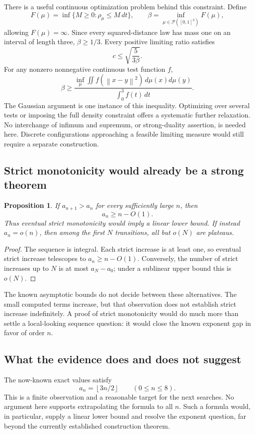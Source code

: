 \documentclass[11pt,letterpaper]{article}
\newtheorem{proposition}[theorem]{Proposition}
\theoremstyle{definition}
\newcommand{\floor}[1]{\left\lfloor #1\right\rfloor}
\newcommand{\norm}[1]{\left\lVert #1\right\rVert}
\begin{document}
There is a useful continuous optimization problem behind this
constraint. Define
\[
 F(\mu)=\inf\{M\ge0:\rho_\mu\le M\,dt\},\qquad
 \beta=\inf_{\mu\in\mathcal P([0,1]^3)}F(\mu),
\]
allowing \(F(\mu)=\infty\). Since every squared-distance law has
mass one on an interval of length three, \(\beta\ge1/3\).
Every positive limiting ratio satisfies
\[
 c\le\sqrt{\frac5{3\beta}}.
\]
For any nonzero nonnegative continuous test function \(f\),
\[
 \beta\ge
 \frac{\displaystyle\inf_\mu
   \iint f(\norm{x-y}^2)\,d\mu(x)d\mu(y)}
      {\displaystyle\int_0^3f(t)\,dt}.
\]
The Gaussian argument is one instance of this inequality. Optimizing
over several tests or imposing the full density constraint offers
a systematic further relaxation. No interchange of infimum and
supremum, or strong-duality assertion, is needed here. Discrete
configurations approaching a feasible limiting measure would still
require a separate construction.

\subsection{Strict monotonicity would already be a strong theorem}
\begin{proposition}
\label{prop:strict}
If \(a_{n+1}>a_n\) for every sufficiently large \(n\), then
\[
 a_n\ge n-O(1).
\]
Thus eventual strict monotonicity would imply a linear lower bound.
If instead \(a_n=o(n)\), then among the first \(N\) transitions,
all but \(o(N)\) are plateaus.
\end{proposition}
\begin{proof}
The sequence is integral. Each strict increase is at least one, so
eventual strict increase telescopes to \(a_n\ge n-O(1)\).
Conversely, the number of strict increases up to \(N\) is at most
\(a_N-a_0\); under a sublinear upper bound this is \(o(N)\).
\end{proof}

The known asymptotic bounds do not decide between these alternatives.
The small computed terms increase, but that observation does not
establish strict increase indefinitely. A proof of strict monotonicity
would do much more than settle a local-looking sequence question: it
would close the known exponent gap in favor of order \(n\).

\subsection{What the evidence does and does not suggest}
The now-known exact values satisfy
\[
 a_n=\floor{3n/2}\qquad(0\le n\le8).
\]
This is a finite observation and a reasonable target for the next
searches. No argument here supports extrapolating the formula to all
\(n\). Such a formula would, in particular, supply a linear lower
bound and resolve the exponent question, far beyond the currently
established construction theorem.
\end{document}

